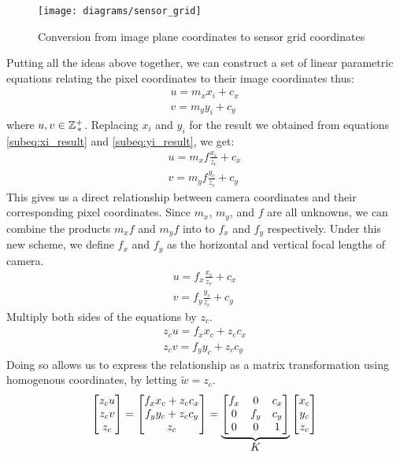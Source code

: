 \begin{figure}[H]
    \centering
    \texttt{[image: diagrams/sensor\_grid]}
    \caption{Conversion from image plane coordinates to sensor grid coordinates}
\end{figure}
Putting all the ideas above together, we can construct a set of linear parametric equations relating the pixel coordinates to their image coordinates thus:
\begin{align*}
    u = m_x x_i + c_x \\
    v = m_y y_i + c_y
\end{align*}
where $u, v \in \mathbb{Z}^+_{\,*}$. Replacing $x_i$ and $y_i$ for the result we obtained from equations \ref{subeq:xi_result} and \ref{subeq:yi_result}, we get:
\begin{align*}
    u = m_x f \frac{x_c}{z_c} + c_x \\
    v = m_y f \frac{y_c}{z_c} + c_y
\end{align*}
This gives us a direct relationship between camera coordinates and their corresponding pixel coordinates. Since $m_x$, $m_y$, and $f$ are all unknowns, we can combine the products $m_x f$ and $m_y f$ into to $f_x$ and $f_y$ respectively. Under this new scheme, we define $f_x$ and $f_y$ as the horizontal and vertical focal lengths of camera.
\begin{gather}
    u = f_x \frac{x_c}{z_c} + c_x \\
    v = f_y \frac{y_c}{z_c} + c_y
\end{gather}
Multiply both sides of the equations by $z_c$.
\begin{subequations}
    \begin{gather*}
        z_c u = f_x x_c + z_c c_x \\
        z_c v = f_y y_c + z_c c_y
    \end{gather*}
\end{subequations}
Doing so allows us to express the relationship as a matrix transformation using homogenous coordinates, by letting $\widetilde{w} = z_c$.
\begin{equation}
    \begin{bmatrix}
        z_c u \\ z_c v \\ z_c
    \end{bmatrix}
    =
    \begin{bmatrix}
        f_x x_c + z_c c_x \\ f_y y_c + z_c c_y \\ z_c
    \end{bmatrix}
    =
    \underbrace{
        \begin{bmatrix}
            f_x & 0   & c_x \\
            0   & f_y & c_y \\
            0   & 0   & 1
        \end{bmatrix}
    }_{\mathlarger{K}}
    \begin{bmatrix}
        x_c \\ y_c \\ z_c
    \end{bmatrix}
\end{equation}
